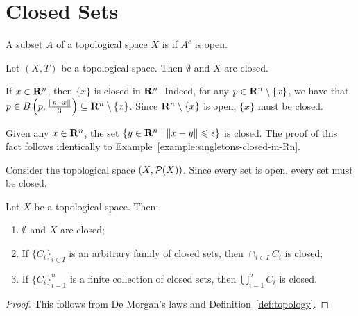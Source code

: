 \section{Closed Sets}

\begin{definition}
    A subset $A$ of a topological space $X$ is  if $A^c$ is open.
\end{definition}

\begin{example}
    Let $(X,T)$ be a topological space. Then $\emptyset$ and $X$ are closed.
\end{example}

\begin{example}\label{example:singletons-closed-in-Rn}
    If $x \in \mathbf{R}^n$, then $\{x\}$ is closed in $\mathbf{R}^n$. Indeed, for any $p \in \mathbf{R}^n \setminus \{x\}$, we have that $p \in B \left( p , \frac{\left\lVert p - x \right\rVert}{3} \right) \subseteq \mathbf{R}^n\setminus\{x\}$. Since $\mathbf{R}^n \setminus \{x\}$ is open, $\{x\}$ must be closed.
\end{example}

\begin{example}
    Given any $x \in \mathbf{R}^n$, the set $\{y \in \mathbf{R}^n \mid \left\lVert x - y \right\rVert \leqslant \epsilon\}$ is closed. The proof of this fact follows identically to Example~\ref{example:singletons-closed-in-Rn}.
\end{example}

\begin{example}
    Consider the topological space $(X,\mathcal{P}(X))$. Since every set is open, every set must be closed.
\end{example}

\begin{proposition}
    Let $X$ be a topological space. Then:
    \begin{enumerate}[label = (\arabic*),itemsep=1pt,topsep=3pt]
        \item $\emptyset$ and $X$ are closed;
        \item If $\{C_i\}_{i \in I}$ is an arbitrary family of closed sets, then $\cap_{i \in I}C_i$ is closed;
        \item If $\{C_i\}_{i =1}^n$ is a finite collection of closed sets, then $\bigcup_{i = 1}^n C_i$ is closed.
    \end{enumerate}
\end{proposition}
    \begin{proof}
        This follows from De Morgan's laws and Definition~\ref{def:topology}.
    \end{proof}

